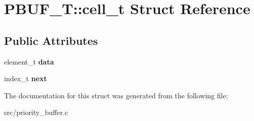 \hypertarget{structPBUF__T_1_1cell__t}{}\section{P\+B\+U\+F\+\_\+T\+:\+:cell\+\_\+t Struct Reference}
\label{structPBUF__T_1_1cell__t}
\subsection*{Public Attributes}
\begin{DoxyCompactItemize}
\item 
\mbox{\label{structPBUF__T_1_1cell__t_a54a9417b1db0c34e17000dfd7a13a9c9}} 
element\+\_\+t {\bfseries data}
\item 
\mbox{\label{structPBUF__T_1_1cell__t_a625892f527969dbfc3e33dcf8c9fa0c3}} 
index\+\_\+t {\bfseries next}
\end{DoxyCompactItemize}


The documentation for this struct was generated from the following file\+:\begin{DoxyCompactItemize}
\item 
src/priority\+\_\+buffer.\+c\end{DoxyCompactItemize}
